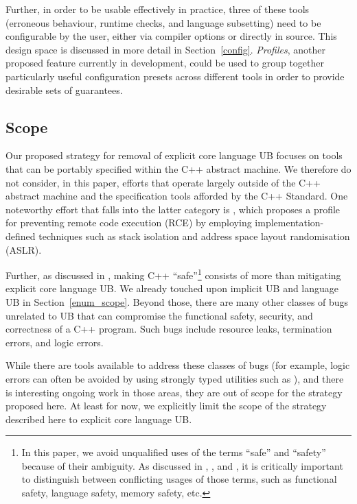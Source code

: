 {Further, in order to be usable effectively in practice, three of these tools (erroneous behaviour, runtime checks, and language subsetting) need to be configurable by the user, either via compiler options or directly in source. This design space is discussed in more detail in Section~\ref{config}. \emph{Profiles}, another proposed feature currently in development, could be used to group together particularly useful configuration presets across different tools in order to provide desirable sets of guarantees.

\subsection{Scope}

Our proposed strategy for removal of explicit core language UB focuses on tools that can be portably specified within the C++ abstract machine. We therefore do not consider, in this paper, efforts that operate largely outside of the C++ abstract machine and the specification tools afforded by the C++ Standard. One noteworthy effort that falls into the latter category is  \cite{P3627R0}, which proposes a profile for preventing remote code execution (RCE) by employing implementation-defined techniques such as stack isolation and address space layout randomisation (ASLR).

Further, as discussed in \cite{P3700R0}, making C++ ``safe''\footnote{In this paper, we avoid unqualified uses of the terms ``safe'' and ``safety'' because of their ambiguity. As discussed in \cite{P3376R0}, \cite{P3500R1}, and \cite{P3578R0}, it is critically important to distinguish between conflicting usages of those terms, such as functional safety, language safety, memory safety, etc.} consists of more than mitigating explicit core language UB. We already touched upon implicit UB and language UB in Section~\ref{enum_scope}. Beyond those, there are many other classes of bugs unrelated to UB that can compromise the functional safety, security, and correctness of a C++ program. Such bugs include resource leaks, termination errors, and logic errors. 

While there are tools available to address these classes of bugs (for example, logic errors can often be avoided by using strongly typed utilities such as \cite{P3045R6}), and there is interesting ongoing work in those areas, they are out of scope for the strategy proposed here. At least for now, we explicitly limit the scope of the strategy described here to explicit core language UB. 

}
